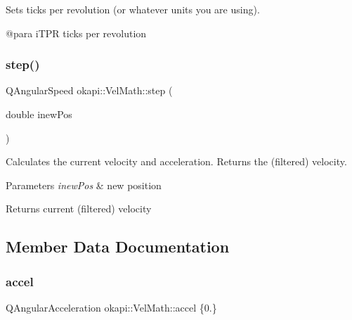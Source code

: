 Sets ticks per revolution (or whatever units you are using).

@para i\+T\+PR ticks per revolution \mbox{\label{classokapi_1_1VelMath_a4c6e14c7f2054512b59a30736f61982f}} 
\subsubsection{\texorpdfstring{step()}{step()}}
{\footnotesize\ttfamily Q\+Angular\+Speed okapi\+::\+Vel\+Math\+::step (\begin{DoxyParamCaption}\item[{double}]{inew\+Pos }\end{DoxyParamCaption})\hspace{0.3cm}{\ttfamily [virtual]}}

Calculates the current velocity and acceleration. Returns the (filtered) velocity.


\begin{DoxyParams}{Parameters}
{\em inew\+Pos} & new position \\
\hline
\end{DoxyParams}
\begin{DoxyReturn}{Returns}
current (filtered) velocity 
\end{DoxyReturn}


\subsection{Member Data Documentation}
\mbox{\label{classokapi_1_1VelMath_abe73288852f21916155e04266faea8b7}} 
\subsubsection{\texorpdfstring{accel}{accel}}
{\footnotesize\ttfamily Q\+Angular\+Acceleration okapi\+::\+Vel\+Math\+::accel \{0.\}\hspace{0.3cm}{\ttfamily [protected]}}

\mbox{\label{classokapi_1_1VelMath_ab100cf49e925d37139d5bf4c4aca87d0}} 

